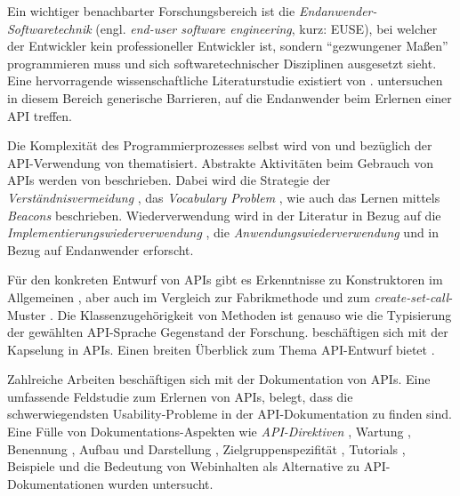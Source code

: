 Ein wichtiger benachbarter Forschungsbereich ist die \textit{Endanwender-Softwaretechnik} (engl. \textit{end-user software engineering}, kurz: EUSE), bei welcher der Entwickler kein professioneller Entwickler ist, sondern ``gezwungener Maßen'' programmieren muss und sich softwaretechnischer Disziplinen ausgesetzt sieht. Eine hervorragende wissenschaftliche Literaturstudie existiert von \cite{Ko:2011el}. \cite{AndrewJKo:2004df} untersuchen in diesem Bereich generische Barrieren, auf die Endanwender beim Erlernen einer API treffen.

Die Komplexität des Programmierprozesses selbst wird von \cite{Daughtry:2009be,Sarodnick:2006vc} und bezüglich der API-Verwendung von \cite{Bruch:2006bv} thematisiert. Abstrakte Aktivitäten beim Gebrauch von APIs werden von \cite{Stylos:2009ts} beschrieben.
Dabei wird die Strategie der \textit{Verständnisvermeidung} \citep{Lange:1989jr,Stylos:2008jt}, das \textit{Vocabulary Problem} \citep{Good:1984kr,Furnas:1987hl}, wie auch das Lernen mittels \textit{Beacons} beschrieben. Wiederverwendung wird in der Literatur in Bezug auf die \textit{Implementierungswiederverwendung} \citep{Lange:1989jr}, die \textit{Anwendungswiederverwendung} \citep{Rosson:1996da,Fairbanks:2006jw} und in Bezug auf Endanwender \citep{Ko:2005cl} erforscht.

Für den konkreten Entwurf von APIs gibt es Erkenntnisse zu Konstruktoren im Allgemeinen \citep{Zibran:2011fx}, aber auch im Vergleich zur Fabrikmethode \citep{Ellis:2007kv} und zum \textit{create-set-call}-Muster \citep{Stylos:2007jb}. Die Klassenzugehörigkeit von Methoden \citep{Stylos:2008jt} ist genauso wie die Typisierung der gewählten API-Sprache \citep{Mayer:2012kl} Gegenstand der Forschung. \cite{Schmidt:br,Roberts:1997tt} beschäftigen sich mit der Kapselung in APIs. Einen breiten Überblick zum Thema API-Entwurf bietet \cite{Zibran:2011fx}.

Zahlreiche Arbeiten beschäftigen sich mit der Dokumentation von APIs. Eine umfassende Feldstudie \citep{Robillard:2010bh} zum Erlernen von APIs, belegt, dass die schwerwiegendsten Usability-Probleme in der API-Dokumentation zu finden sind. Eine Fülle von Dokumentations-Aspekten wie  
\textit{API-Direktiven} \citep{dekel2011increasing,Monperrus:2011bf}, Wartung \citep{DaqingHou:2005ba,Shi:2011tb}, Benennung \citep{Aguiar:2000dn,Stylos:2009gc,Blinman:2005wr,cwalina2008framework,Teasley:1994gr,Bloch:2006jk}, Aufbau und Darstellung \citep{DaqingHou:2005ba,Jeong:kf}, Zielgruppenspezifität \citep{Fairbanks:2006jw,Ko:2011vw,Pugh:Ks4cicwp,Nykaza:2002im}, Tutorials \citep{Nykaza:2002im}, Beispiele \citep{Tenny:1988ir,Jeong:kf,DaqingHou:2005ba,Shull:2000fy} und die Bedeutung von Webinhalten als Alternative zu API-Dokumentationen \citep{Parnin:2011kp,Stylos:2006gu} wurden untersucht.

